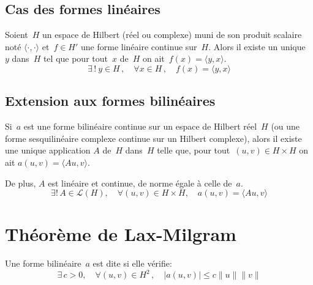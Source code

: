 \medskip
\subsection{Cas des formes linéaires}

\begin{theoreme}
Soient~$H$ un espace de Hilbert (réel ou complexe) muni de son produit scalaire noté
$\langle\cdot,\cdot\rangle$ et~$f \in H'$ une forme linéaire continue sur~$H$.
Alors il existe un unique~$y$ dans~$H$ tel que pour tout~$x$ de~$H$ on ait~$f(x)=\langle y,x\rangle$.
\begin{equation}
\exists\,!\ y \in H\,, \quad \forall x\in H\,, \quad f(x) = \langle y,x\rangle
\end{equation}
\end{theoreme}

\medskip
\subsection{Extension aux formes bilinéaires}

%
Si~$a$ est une forme bilinéaire continue sur un espace de Hilbert réel~$H$ (ou une forme
sesquilinéaire complexe continue sur un Hilbert complexe), alors il existe une unique application
$A$ de~$H$ dans~$H$ telle que, pour tout~$(u,v)\in H\times H$ on ait
$a(u,v)=\langle Au,v \rangle$.

De plus, $A$ est linéaire et continue, de norme égale à celle de~$a$.
\begin{equation}
\exists !\,A\in \mathcal{L}(H),\quad \forall (u,v)\in H\times H,\quad a(u,v)=\langle Au,v \rangle
\end{equation}

\medskip
\section{Théorème de Lax-Milgram}\label{Sec-ThLaxMilgram}\label{Sec:LaxMil}

\medskip
\begin{definition}
Une forme bilinéaire~$a$ est dite  si elle vérifie:
\begin{equation}
\exists\,c>0,\quad \forall (u,v)\in H^2\,,\quad |a(u,v)|\leq c\|u\|\|v\|
\end{equation}
\end{definition}

